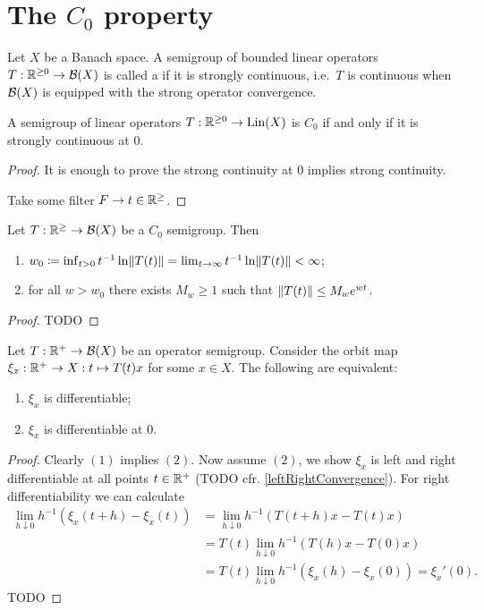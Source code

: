 \section{The $C_0$ property}
\begin{definition}
Let $X$ be a Banach space. A semigroup of bounded linear operators $T: \mathbb{R}^{\geq 0} \to \operatorname{\mathcal{B}}(X)$ is called a  if it is strongly continuous, i.e.\ $T$ is continuous when $\operatorname{\mathcal{B}}(X)$ is equipped with the strong operator convergence.
\end{definition}

\begin{lemma}
A semigroup of linear operators $T: \mathbb{R}^{\geq 0} \to \operatorname{Lin}(X)$ is $C_0$ \textup{if and only if} it is strongly continuous at $0$.
\end{lemma}
\begin{proof}
It is enough to prove the strong continuity at $0$ implies strong continuity.

Take some filter $F\to t\in\mathbb{R}^{\geq}$.
\end{proof}

\begin{proposition}
Let $T: \mathbb{R}^{\geq} \to \operatorname{\mathcal{B}}(X)$ be a $C_0$ semigroup. Then
\begin{enumerate}
\item $w_0 \coloneqq \inf_{t>0}t^{-1}\ln\lVert T(t)\rVert = \lim_{t\to \infty}t^{-1}\ln\lVert T(t)\rVert < \infty$;
\item for all $w > w_0$ there exists $M_w \geq 1$ such that $\lVert T(t)\rVert \leq M_we^{wt}$.
\end{enumerate}
\end{proposition}
\begin{proof}
TODO
\end{proof}

\begin{lemma}
Let $T: \mathbb{R}^+\to \operatorname{\mathcal{B}}(X)$ be an operator semigroup. Consider the orbit map $\xi_x: \mathbb{R}^+ \to X: t\mapsto T(t)x$ for some $x\in X$. The following are equivalent:
\begin{enumerate}
\item $\xi_x$ is differentiable;
\item $\xi_x$ is differentiable at $0$.
\end{enumerate}
\end{lemma}
\begin{proof}
Clearly $(1)$ implies $(2)$. Now assume $(2)$, we show $\xi_x$ is left and right differentiable at all points $t\in\mathbb{R}^+$ (TODO cfr. \ref{leftRightConvergence}). For right differentiability we can calculate
\begin{align*}
\lim_{h\downarrow 0} h^{-1}(\xi_x(t+h) - \xi_x(t)) &= \lim_{h\downarrow 0} h^{-1}(T(t+h)x - T(t)x) \\
&= T(t)\lim_{h\downarrow 0} h^{-1}(T(h)x - T(0)x) \\
&= T(t)\lim_{h\downarrow 0} h^{-1}(\xi_x(h) - \xi_x(0)) = \xi_x'(0).
\end{align*}
TODO
\end{proof}

